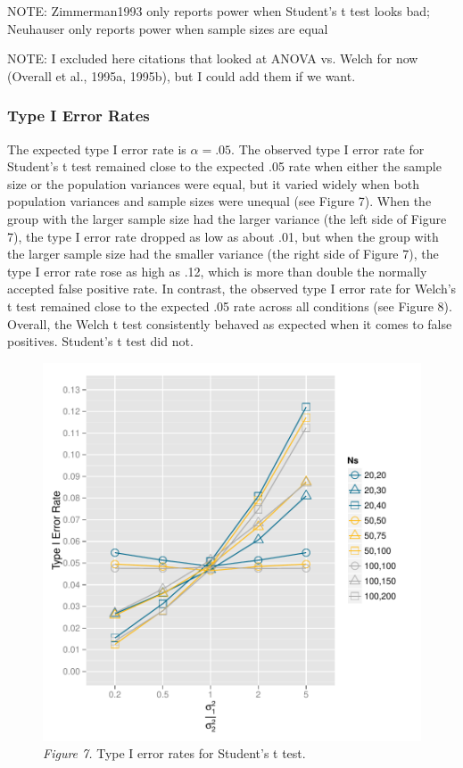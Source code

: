 \documentclass[man,a4paper,noextraspace,apacite]{apa6}
\begin{document}
NOTE: Zimmerman1993 only reports power when Student's t test looks bad; Neuhauser only reports power when sample sizes are equal

NOTE: I excluded here citations that looked at ANOVA vs. Welch for now (Overall et al., 1995a, 1995b), but I could add them if we want.
    
\subsubsection{Type I Error Rates}

    The expected type I error rate is $\alpha = .05$. The observed type I error rate for Student's t test remained close to the expected .05 rate when either the sample size or the population variances were equal, but it varied widely when both population variances and sample sizes were unequal (see Figure 7). When the group with the larger sample size had the larger variance (the left side of Figure 7), the type I error rate dropped as low as about .01, but when the group with the larger sample size had the smaller variance (the right side of Figure 7), the type I error rate rose as high as .12, which is more than double the normally accepted false positive rate. In contrast, the observed type I error rate for Welch's t test remained close to the expected .05 rate across all conditions (see Figure 8). Overall, the Welch t test consistently behaved as expected when it comes to false positives. Student's t test did not.

\begin{figure}    
\includegraphics{WelchManuscript-MASTER-Type1ClassicPlot}
\textit{Figure 7.} Type I error rates for Student's t test.
\end{figure}
\end{document}

